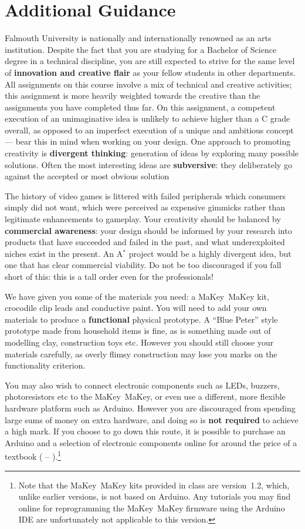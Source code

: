 \documentclass{../fal_assignment}
\begin{document}
\section*{Additional Guidance}

Falmouth University is nationally and internationally renowned as an arts institution.
Despite the fact that you are studying for a Bachelor of Science degree in a technical discipline,
you are still expected to strive for the same level of \textbf{innovation and creative flair}
as your fellow students in other departments.
All assignments on this course involve a mix of technical and creative activities;
this assignment is more heavily weighted towards the creative than the assignments you have completed thus far.
On this assignment, a competent execution of an unimaginative idea is unlikely to achieve higher than a C grade overall,
as opposed to an imperfect execution of a unique and ambitious concept
--- bear this in mind when working on your design.
One approach to promoting creativity is
\textbf{divergent thinking}: generation of ideas by exploring many possible solutions.
Often the most interesting ideas are \textbf{subversive}: they deliberately go against the
accepted or most obvious solution

The history of video games is littered with failed peripherals which consumers simply did not want,
which were perceived as expensive gimmicks rather than legitimate enhancements to gameplay.
Your creativity should be balanced by \textbf{commercial awareness}:
your design should be informed by your research into products that have succeeded and failed
in the past, and what underexploited niches exist in the present.
An A$^*$ project would be a highly divergent idea, but one that has clear commercial viability.
Do not be too discouraged if you fall short of this: this is a tall order even for the professionals!

We have given you some of the materials you need: a MaKey~MaKey kit, crocodile clip leads and conductive paint.
You will need to add your own materials to produce a \textbf{functional} physical prototype.
A ``Blue Peter'' style prototype made from household items is fine,
as is something made out of modelling clay, construction toys etc.
However you should still choose your materials carefully, as overly flimsy construction may
lose you marks on the functionality criterion.

You may also wish to connect electronic components such as LEDs, buzzers, photoresistors etc to the MaKey~MaKey,
or even use a different, more flexible hardware platform such as Arduino.
However you are discouraged from spending large sums of money on extra hardware,
and doing so is \textbf{not required} to achieve a high mark.
If you choose to go down this route,
it is possible to purchase an Arduino and a selection of electronic components online for 
around the price of a textbook ( -- ).\footnote{
    Note that the MaKey~MaKey kits provided in class are version~1.2, which, unlike earlier versions, is not based on Arduino.
    Any tutorials you may find online for reprogramming the MaKey~MaKey firmware using the Arduino IDE
    are unfortunately not applicable to this version.
}
\end{document}
